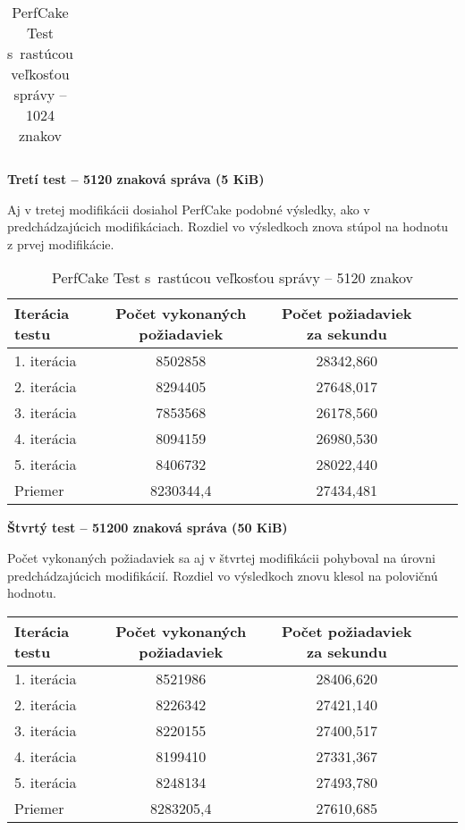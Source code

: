 \documentclass[12pt,oneside,final]{fithesis-utf8}
\begin{document}
\begin{itemize}
\begin{table}[H]
\begin{center}
\begin{tabular}{ | l | c | c | c | c |}
\end{tabular}
\end{center}
\caption{PerfCake Test s~rastúcou veľkosťou správy -- 1024 znakov}
\end{table}


\textbf{Tretí test -- 5120 znaková správa (5 KiB)}

Aj v tretej modifikácii dosiahol PerfCake podobné výsledky, ako v predchádzajúcich modifikáciach. Rozdiel vo výsledkoch znova stúpol na hodnotu z prvej modifikácie.

\begin{table}[H]
\begin{center}
\begin{tabular}{ | l | c | c | c | c |}
		\hline
		 \textbf{Iterácia testu} & \textbf{Počet vykonaných požiadaviek} & \textbf{Počet požiadaviek za sekundu} \\ \hline
		 1. iterácia & 8502858 & 28342,860 \\ \hline
		 2. iterácia & 8294405 & 27648,017 \\ \hline
		 3. iterácia & 7853568 & 26178,560 \\ \hline
		 4. iterácia & 8094159 & 26980,530 \\ \hline
		 5. iterácia & 8406732 & 28022,440 \\ \hline
		 Priemer & 8230344,4 & 27434,481 \\ \hline
		 
\end{tabular}
\end{center}
\caption{PerfCake Test s~rastúcou veľkosťou správy -- 5120 znakov}
\end{table}


\textbf{Štvrtý test -- 51200 znaková správa (50 KiB)}

Počet vykonaných požiadaviek sa aj v štvrtej modifikácii pohyboval na úrovni predchádzajúcich modifikácií. Rozdiel vo výsledkoch znovu klesol na polovičnú hodnotu.

\begin{table}[H]
\begin{center}
\begin{tabular}{ | l | c | c | c | c |}
		\hline
		 \textbf{Iterácia testu} & \textbf{Počet vykonaných požiadaviek} & \textbf{Počet požiadaviek za sekundu} \\ \hline
		 1. iterácia & 8521986 & 28406,620 \\ \hline
		 2. iterácia & 8226342 & 27421,140 \\ \hline
		 3. iterácia & 8220155 & 27400,517 \\ \hline
		 4. iterácia & 8199410 & 27331,367 \\ \hline
		 5. iterácia & 8248134 & 27493,780 \\ \hline
		 Priemer & 8283205,4 & 27610,685 \\ \hline
		 

\end{tabular}
\end{center}
\end{table}
\end{itemize}
\end{document}

